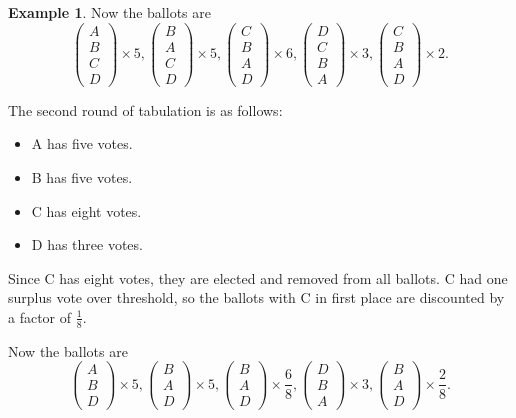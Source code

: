 \documentclass{amsart}
\theoremstyle{definition}
\newtheorem{example}{Example}
\begin{document}
\begin{example}
    Now the ballots are 
    \[\begin{pmatrix}
        A\\B\\C\\D
    \end{pmatrix} \times 5, \begin{pmatrix}
        B\\A\\C\\D
    \end{pmatrix} \times 5, \begin{pmatrix}
        C\\B\\A\\D
    \end{pmatrix} \times 6,
    \begin{pmatrix}
        D\\C\\B\\A
    \end{pmatrix} \times 3, 
    \begin{pmatrix}
        C\\B\\A\\D
    \end{pmatrix} \times 2.\]

    The second round of tabulation is as follows:
    \begin{itemize}
        \item A has five votes.
        \item B has five votes.
        \item C has eight votes.
        \item D has three votes.
    \end{itemize}
    Since C has eight votes, they are elected and removed from all ballots. 
    C had one surplus vote over threshold, so the ballots with C in first place are 
    discounted by a factor of $\frac{1}{8}$.

    Now the ballots are 
    \[\begin{pmatrix}
        A\\B\\D
    \end{pmatrix} \times 5, \begin{pmatrix}
        B\\A\\D
    \end{pmatrix} \times 5, \begin{pmatrix}
        B\\A\\D
    \end{pmatrix} \times \frac{6}{8},
    \begin{pmatrix}
        D\\B\\A
    \end{pmatrix} \times 3, 
    \begin{pmatrix}
        B\\A\\D
    \end{pmatrix} \times \frac{2}{8}.\]


\end{example}
\end{document}
